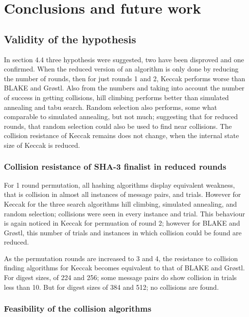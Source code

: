 \chapter{Conclusions and future work}

\section{Validity of the hypothesis}

In section 4.4 three hypothesis were suggested, two have been disproved and one confirmed. When the reduced version
of an algorithm is only done by reducing the number of rounds, then for just rounds 1 and 2, Keccak performs worse
than BLAKE and Gr{\o}stl. Also from the numbers and taking into account the number of success in getting collisions,
hill climbing performs better than simulated annealing and tabu search. Random selection also performs, some what 
comparable to simulated annealing, but not much; suggesting that for reduced rounds, that random selection could
also be used to find near collisions. The collision resistance of Keccak remains does not change, when the internal
state size of Keccak is reduced.

\subsection{Collision resistance of SHA-3 finalist in reduced rounds}

For 1 round permutation, all hashing algorithms display equivalent weakness, that is collision in almost all instances
of message pairs, and trials. However for Keccak for the three search algorithms hill climbing, simulated
annealing, and random selection; collisions were seen in every instance and trial. This behaviour is again noticed
in Keccak for permuation of round 2; however for BLAKE and Gr{\o}stl, this number of trials and instances in which
collision could be found are reduced.

As the permutation rounds are increased to 3 and 4, the resistance to collision finding algorithms for Keccak
becomes equivalent to that of BLAKE and Gr{\o}stl. For digest sizes, of 224 and 256; some message pairs do show
collision in trials less than 10. But for digest sizes of 384 and 512; no collisions are found.

\subsection{Feasibility of the collision algorithms}

